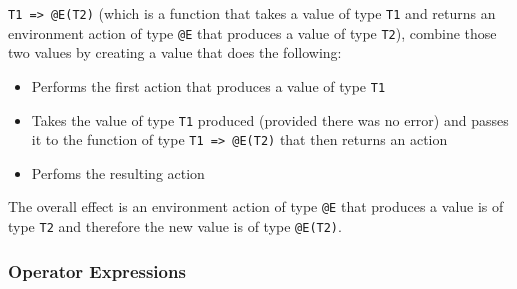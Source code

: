 \documentclass{article}
\begin{document}
\verb|T1 => @E(T2)| (which is a function that takes a value of type
\verb|T1| and returns an environment action of type \verb|@E| that produces
a value of type \verb|T2|), combine those two values by creating a value that
does the following: 
\begin{itemize}
\item
Performs the first action that produces a value of type \verb|T1|

\item
Takes the value of type \verb|T1| produced (provided there was no error) and
passes it to the function of type \verb|T1 => @E(T2)| that then returns an
action

\item
Perfoms the resulting action 
\end{itemize}
The overall effect is an environment action  of type \verb|@E| that produces
a value is of type \verb|T2| and therefore the new value is of type
\verb|@E(T2)|.

\newpage

\subsubsection{Operator Expressions}
\end{document}
